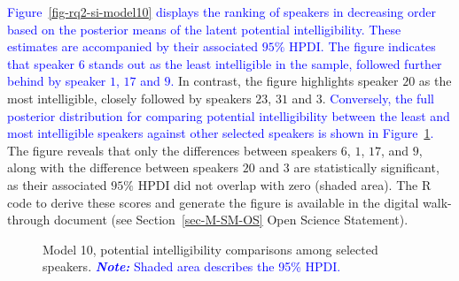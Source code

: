 \documentclass[
  authoryear,
  preprint,
  1p]{elsarticle}
\begin{document}
\textcolor{blue}{Figure~\ref{fig-rq2-si-model10} displays the ranking of speakers in
decreasing order based on the posterior means of the latent potential
intelligibility. These estimates are accompanied by their associated
\(95\%\) HPDI. The figure indicates that speaker \(6\) stands out as the
least intelligible in the sample, followed further behind by speaker
\(1\), \(17\) and \(9\).} In contrast, the figure highlights speaker
\(20\) as the most intelligible, closely followed by speakers \(23\),
\(31\) and \(3\). \textcolor{blue}{Conversely, the full posterior distribution for
comparing potential intelligibility between the least and most
intelligible speakers against other selected speakers is shown in
Figure~\ref{fig-si_contr_model10}.} The figure reveals that only the
differences between speakers \(6\), \(1\), \(17\), and \(9\), along with
the difference between speakers \(20\) and \(3\) are statistically
significant, as their associated \(95\%\) HPDI did not overlap with zero
(shaded area). The R code to derive these scores and generate the figure
is available in the digital walk-through document (see
Section~\ref{sec-M-SM-OS} Open Science Statement).

\label{cell-fig-si_contr_model10}
\begin{figure}[H]


\caption{\label{fig-si_contr_model10}Model 10, potential intelligibility
comparisons among selected speakers. \textcolor{blue}{\textbf{\emph{Note:}} Shaded area
describes the 95\% HPDI.}}

\end{figure}%
\end{document}
